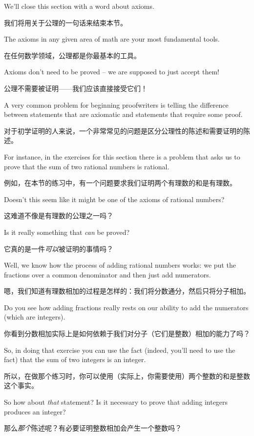 \newpage

We'll close this section with a word about axioms.

我们将用关于公理的一句话来结束本节。

The axioms in any
given area of math are your most fundamental tools.

在任何数学领域，公理都是你最基本的工具。

Axioms don't
need to be proved -- we are supposed to just accept them!

公理不需要被证明——我们应该直接接受它们！

A very common
problem for beginning proofwriters is telling the difference between statements
that are axiomatic and statements that require some proof.

对于初学证明的人来说，一个非常常见的问题是区分公理性的陈述和需要证明的陈述。

For instance, in the
exercises for this section there is a problem that asks us to prove that the sum of
two rational numbers is rational.

例如，在本节的练习中，有一个问题要求我们证明两个有理数的和是有理数。

Doesn't this seem like it might be one of
the axioms of rational numbers?

这难道不像是有理数的公理之一吗？

Is it really something that {\em can} be proved?

它真的是一件{\em 可以}被证明的事情吗？

Well, we know how the process of adding rational numbers works: we put the
fractions over a common
denominator and then just add numerators.

嗯，我们知道有理数相加的过程是怎样的：我们将分数通分，然后只将分子相加。

Do you see how adding fractions really rests
on our ability to add the numerators (which are integers).

你看到分数相加实际上是如何依赖于我们对分子（它们是整数）相加的能力了吗？

So, in doing that exercise you
can use the fact (indeed, you'll need to use the fact) that the sum of two integers is an integer.

所以，在做那个练习时，你可以使用（实际上，你需要使用）两个整数的和是整数这个事实。

So how about {\em that} statement?  Is it necessary to prove that adding integers produces
an integer?

那么{\em 那个}陈述呢？有必要证明整数相加会产生一个整数吗？

